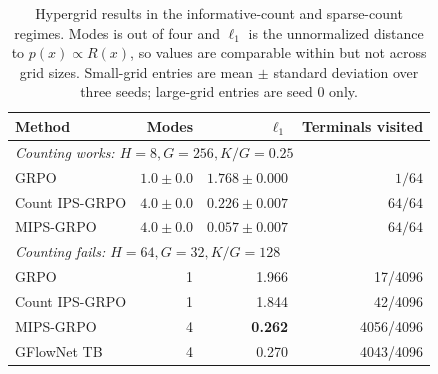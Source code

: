 \begin{table}[t]
\centering
\caption{Hypergrid results in the informative-count and sparse-count regimes.
Modes is out of four and \(\ell_1\) is the unnormalized distance to
\(p(x)\propto R(x)\), so values are comparable within but not across grid
sizes. Small-grid entries are mean \(\pm\) standard deviation over three
seeds; large-grid entries are seed 0 only.}
\label{tab:hypergrid}
\begin{tabular}{lrrr}
\toprule
Method & Modes & \(\ell_1\) & Terminals visited \\
\midrule
\multicolumn{4}{l}{\emph{Counting works: \(H=8,G=256,K/G=0.25\)}}\\
GRPO & \(1.0\pm0.0\) & \(1.768\pm0.000\) & \(1/64\) \\
Count IPS-GRPO & \(4.0\pm0.0\) & \(0.226\pm0.007\) & \(64/64\) \\
MIPS-GRPO & \(4.0\pm0.0\) & \(\mathbf{0.057\pm0.007}\) & \(64/64\) \\
\midrule
\multicolumn{4}{l}{\emph{Counting fails: \(H=64,G=32,K/G=128\)}}\\
GRPO & 1 & 1.966 & 17/4096 \\
Count IPS-GRPO & 1 & 1.844 & 42/4096 \\
MIPS-GRPO & 4 & \textbf{0.262} & 4056/4096 \\
GFlowNet TB & 4 & 0.270 & 4043/4096 \\
\bottomrule
\end{tabular}
\end{table}

